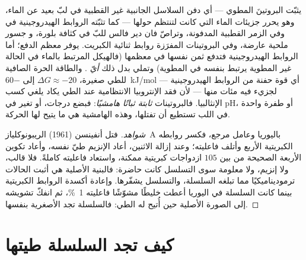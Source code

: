 \begin{proposition}\label{prop:b3:structural-biology:forces}
يثبّت البروتينَ المطوي \emph{} ---
أي دفن السلاسل الجانبية غير القطبية في لبّ بعيد عن الماء، وهو يحرر
جزيئات الماء التي كانت لتنتظم حولها --- كما تثبّته
الروابط الهيدروجينية في  وفي الزمر القطبية
المدفونة، وتراصّ فان دير فالس للبّ في كثافة بلورة، و
جسور ملحية عارضة، وفي البروتينات المفرَزة روابط ثنائية
الكبريت.  يوفر معظم الدفع؛ أما الروابط
الهيدروجينية فتدفع ثمن نفسها في معظمها (فالهيكل المرتبط بالماء في
الحالة غير المطوية يرتبط بنفسه في المطوية) وتملي بدل ذلك
\emph{أيّ} . والطاقة الحرة الصافية للطي صغيرة،
$\Delta G \approx -20$ إلى \qty{-60}{kJ/mol} --- أي قوة
حفنة من الروابط الهيدروجينية لجزيء فيه مئات منها --- لأن
فقد الإنتروبيا الانتظامية عند الطي يكاد يلغي كسب
الإنثالبيا. فالبروتينات \emph{ثابتة ثباتًا هامشيًا}: فبضع درجات، أو
تغير في pH، أو طفرة واحدة في اللب تستطيع أن تفتلها، وهذه
الهامشية هي ما يتيح لها الحركة.
\end{proposition}

\begin{proof}[شواهد]
فتل أنفينسن (1961) الريبونوكلياز~A باليوريا وعامل مرجع،
فكسر روابطه الكبريتية الأربع وأتلف فاعليته؛ وعند إزالة
الاثنين، أعاد الإنزيم طيّ نفسه، وأعاد تكوين الأربعة الصحيحة من بين $105$
ازدواجات كبريتية ممكنة، واستعاد فاعليته كاملةً. فلا قالب،
ولا إنزيم، ولا معلومة سوى التسلسل كانت حاضرة: فالبنية
الأصلية هي أثبت الحالات ترموديناميكيًا مما تبلغه
السلسلة، والتسلسل يشفّرها. وإعادة أكسدة الروابط الكبريتية بينما
كانت السلسلة في اليوريا أعطت خليطًا مشوّشًا فاعليته \qty{1}{\%}،
ثم انفكّ تشويشه إلى الصورة الأصلية حين أُتيح له
الطي: فالسلسلة تجد الأصغرية بنفسها.
\end{proof}

\section{كيف تجد السلسلة طيتها}


